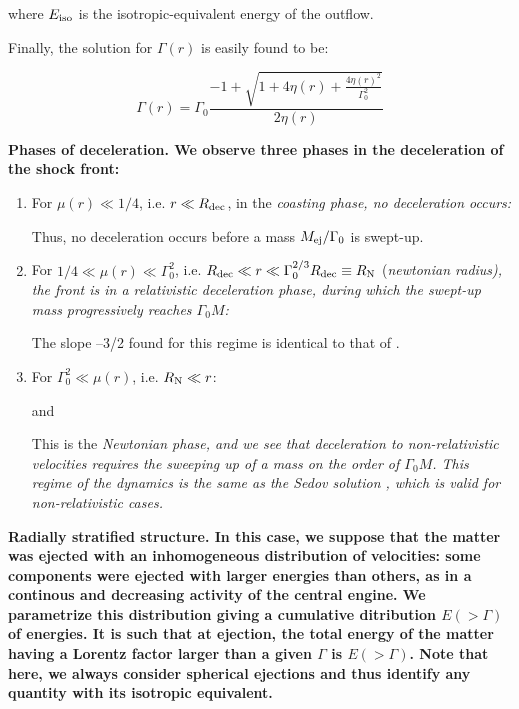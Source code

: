 where $E_\rm{iso}$ is the isotropic-equivalent energy of the outflow.

Finally, the solution for $\Gamma(r)$ is easily found to be:

\begin{equation}\Gamma(r) = \Gamma_0 \frac{-1 + \sqrt{1 + 4\eta(r) + \frac{4\eta(r) ^ 2}{\Gamma_0^2}}}{2 \eta(r)}\end{equation}

\bf{Phases of deceleration.} We observe three phases in the deceleration of the shock front:

\begin{enumerate}
	\item For $\mu(r) \ll 1/4$, i.e. $r \ll R_{\rm{dec}}$, in the \it{coasting phase}, no deceleration occurs:


    Thus, no deceleration occurs before a mass $M_{\rm{ej}}/\Gamma_0$ is swept-up.

	\item For $1/4 \ll \mu(r) \ll \Gamma_0 ^ 2$, i.e. $R_{\rm{dec}} \ll r \ll \Gamma_0^{2/3} R_{\rm{dec}} \equiv R_{\rm{N}}$ (\it{newtonian radius}), the front is in a \it{relativistic deceleration phase}, during which the swept-up mass progressively reaches $\Gamma_0 M$:


    The slope --3/2 found for this regime is identical to that of \citep{59}.

	\item For $\Gamma_0^2 \ll \mu(r)$, i.e. $ R_{\rm{N}} \ll r$:


	and


	This is the \it{Newtonian phase}, and we see that deceleration to non-relativistic velocities requires the sweeping up of a mass on the order of $\Gamma_0 M$. This regime of the dynamics is the same as the Sedov solution \citep{60}, which is valid for non-relativistic cases.
\end{enumerate}

\bf{Radially stratified structure.} In this case, we suppose that the matter was ejected with an inhomogeneous distribution of velocities: some components were ejected with larger energies than others, as in a continous and decreasing activity of the central engine. We parametrize this distribution giving a cumulative ditribution $E( > \Gamma)$ of energies. It is such that at ejection, the total energy of the matter having a Lorentz factor larger than a given $\Gamma$ is $E( > \Gamma)$. Note that here, we always consider spherical ejections and thus identify any quantity with its isotropic equivalent.

